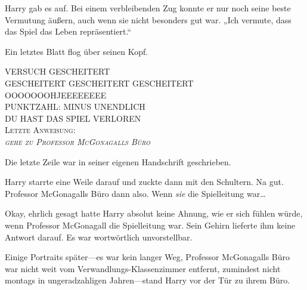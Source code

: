 Harry gab es auf. Bei einem verbleibenden Zug konnte er nur noch seine beste Vermutung äußern, auch wenn sie nicht besonders gut war. „Ich vermute, dass das Spiel das Leben repräsentiert.“

Ein letztes Blatt flog über seinen Kopf.

\begin{writtenNote}\centering
\scshape
%
\uppercase{
Versuch gescheitert\\
Gescheitert Gescheitert Gescheitert\\
Ooooooohjeeeeeeee\\
Punktzahl: Minus Unendlich\\
\MakeUppercase{Du hast das Spiel verloren}}\\

Letzte Anweisung:\\
\emph{gehe zu Professor McGonagalls Büro}
\end{writtenNote}

Die letzte Zeile war in seiner eigenen Handschrift geschrieben.

Harry starrte eine Weile darauf und zuckte dann mit den Schultern. Na gut. Professor McGonagalls Büro dann also. Wenn \emph{sie} die Spielleitung war…

Okay, ehrlich gesagt hatte Harry absolut keine Ahnung, wie er sich fühlen würde, wenn Professor McGonagall die Spielleitung war. Sein Gehirn lieferte ihm keine Antwort darauf. Es war wortwörtlich unvorstellbar.

Einige Portraits später—es war kein langer Weg, Professor McGonagalls Büro war nicht weit vom Verwandlungs-Klassenzimmer entfernt, zumindest nicht montags in ungeradzahligen Jahren—stand Harry vor der Tür zu ihrem Büro.

